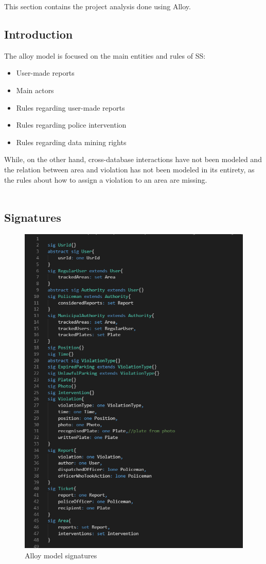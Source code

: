

This section contains the project analysis done using Alloy.\\
\subsection{Introduction}
The alloy model is focused on the main entities and rules of SS:
\begin{itemize}
	\item User-made reports
	\item Main actors
	\item Rules regarding user-made reports
	\item Rules regarding police intervention
	\item Rules regarding data mining rights
\end{itemize}
While, on the other hand, cross-database interactions have not been modeled and the relation between area and violation has not been modeled in its entirety, as the rules about how to assign a violation to an area are missing.\\  
\\
\newpage
\subsection{Signatures}
\begin{figure}[h!]
	\centering
	\includegraphics[scale=0.85 ]{Images/Signatures_1-2}
	\caption{Alloy model signatures}
\end{figure}
\newpage
